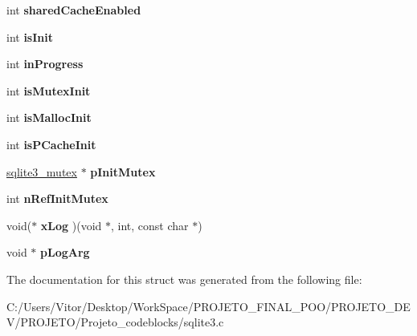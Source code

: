 \begin{DoxyCompactItemize}
\item 
\hypertarget{struct_sqlite3_config_ad9837f5e2f338d708234afdb8878184f}{int {\bfseries shared\-Cache\-Enabled}}\label{struct_sqlite3_config_ad9837f5e2f338d708234afdb8878184f}

\item 
\hypertarget{struct_sqlite3_config_a11f18afbc3476ee16d97e75ad770670e}{int {\bfseries is\-Init}}\label{struct_sqlite3_config_a11f18afbc3476ee16d97e75ad770670e}

\item 
\hypertarget{struct_sqlite3_config_a3cc1f0564475ead1840892e8ac6989ed}{int {\bfseries in\-Progress}}\label{struct_sqlite3_config_a3cc1f0564475ead1840892e8ac6989ed}

\item 
\hypertarget{struct_sqlite3_config_af576d567cc36956e0c4c3a7487b53edf}{int {\bfseries is\-Mutex\-Init}}\label{struct_sqlite3_config_af576d567cc36956e0c4c3a7487b53edf}

\item 
\hypertarget{struct_sqlite3_config_ab0ec050075ee245df0a54623b0073bfc}{int {\bfseries is\-Malloc\-Init}}\label{struct_sqlite3_config_ab0ec050075ee245df0a54623b0073bfc}

\item 
\hypertarget{struct_sqlite3_config_a945ec3af8fd8f2efaccec88e2597393b}{int {\bfseries is\-P\-Cache\-Init}}\label{struct_sqlite3_config_a945ec3af8fd8f2efaccec88e2597393b}

\item 
\hypertarget{struct_sqlite3_config_af8ffb8388972c384840dd36beca35e7e}{\hyperlink{structsqlite3__mutex}{sqlite3\-\_\-mutex} $\ast$ {\bfseries p\-Init\-Mutex}}\label{struct_sqlite3_config_af8ffb8388972c384840dd36beca35e7e}

\item 
\hypertarget{struct_sqlite3_config_a423f5c1b3f68d9c569661a542ebe7220}{int {\bfseries n\-Ref\-Init\-Mutex}}\label{struct_sqlite3_config_a423f5c1b3f68d9c569661a542ebe7220}

\item 
\hypertarget{struct_sqlite3_config_a59bd59da6676dc62f9acdd6ff6d27d82}{void($\ast$ {\bfseries x\-Log} )(void $\ast$, int, const char $\ast$)}\label{struct_sqlite3_config_a59bd59da6676dc62f9acdd6ff6d27d82}

\item 
\hypertarget{struct_sqlite3_config_a501ab4552bc7c54bb413aced5889dcdc}{void $\ast$ {\bfseries p\-Log\-Arg}}\label{struct_sqlite3_config_a501ab4552bc7c54bb413aced5889dcdc}

\end{DoxyCompactItemize}


The documentation for this struct was generated from the following file\-:\begin{DoxyCompactItemize}
\item 
C\-:/\-Users/\-Vitor/\-Desktop/\-Work\-Space/\-P\-R\-O\-J\-E\-T\-O\-\_\-\-F\-I\-N\-A\-L\-\_\-\-P\-O\-O/\-P\-R\-O\-J\-E\-T\-O\-\_\-\-D\-E\-V/\-P\-R\-O\-J\-E\-T\-O/\-Projeto\-\_\-codeblocks/sqlite3.\-c\end{DoxyCompactItemize}
